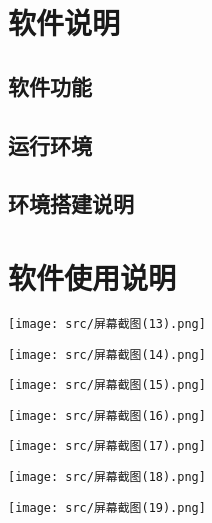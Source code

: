 \documentclass{article}
\begin{document}
\tableofcontents
\newpage

\section{软件说明}



\subsection{软件功能}


\subsection{运行环境}

\subsection{环境搭建说明}


\section{软件使用说明}

\begin{center}
    \texttt{[image: src/屏幕截图(13).png]}
\end{center}


\begin{center}
    \texttt{[image: src/屏幕截图(14).png]}
\end{center}



\begin{center}
    \texttt{[image: src/屏幕截图(15).png]}
\end{center}


\begin{center}
    \texttt{[image: src/屏幕截图(16).png]}
\end{center}


\begin{center}
    \texttt{[image: src/屏幕截图(17).png]}
\end{center}


\begin{center}
    \texttt{[image: src/屏幕截图(18).png]}
\end{center}


\begin{center}
    \texttt{[image: src/屏幕截图(19).png]}
\end{center}
\end{document}
